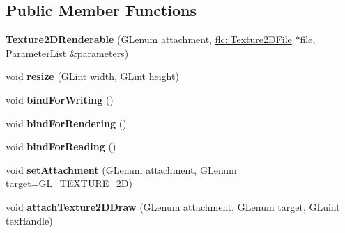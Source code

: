 \subsection*{Public Member Functions}
\begin{DoxyCompactItemize}
\item 
{\bfseries Texture2\+D\+Renderable} (G\+Lenum attachment, \hyperlink{classflw_1_1flc_1_1Texture2DFile}{flc\+::\+Texture2\+D\+File} $\ast$file, Parameter\+List \&parameters)\hypertarget{classflw_1_1flc_1_1Texture2DRenderable_afcb0b361ecb1864667fd45082874a0f5}{}\label{classflw_1_1flc_1_1Texture2DRenderable_afcb0b361ecb1864667fd45082874a0f5}

\item 
void {\bfseries resize} (G\+Lint width, G\+Lint height)\hypertarget{classflw_1_1flc_1_1Texture2DRenderable_aebcd2fea21b574145f4c415dd35ae168}{}\label{classflw_1_1flc_1_1Texture2DRenderable_aebcd2fea21b574145f4c415dd35ae168}

\item 
void {\bfseries bind\+For\+Writing} ()\hypertarget{classflw_1_1flc_1_1Texture2DRenderable_aecee11c1f1089b57b1b795645c3017e4}{}\label{classflw_1_1flc_1_1Texture2DRenderable_aecee11c1f1089b57b1b795645c3017e4}

\item 
void {\bfseries bind\+For\+Rendering} ()\hypertarget{classflw_1_1flc_1_1Texture2DRenderable_abc96dcdc0a74ec89a5d7651f90ae8a0d}{}\label{classflw_1_1flc_1_1Texture2DRenderable_abc96dcdc0a74ec89a5d7651f90ae8a0d}

\item 
void {\bfseries bind\+For\+Reading} ()\hypertarget{classflw_1_1flc_1_1Texture2DRenderable_af6e7b50ce2f60f9678c03946f6a2db21}{}\label{classflw_1_1flc_1_1Texture2DRenderable_af6e7b50ce2f60f9678c03946f6a2db21}

\item 
void {\bfseries set\+Attachment} (G\+Lenum attachment, G\+Lenum target=G\+L\+\_\+\+T\+E\+X\+T\+U\+R\+E\+\_\+2D)\hypertarget{classflw_1_1flc_1_1Texture2DRenderable_a15077132aaaa9b98b55f9d581ad3ba11}{}\label{classflw_1_1flc_1_1Texture2DRenderable_a15077132aaaa9b98b55f9d581ad3ba11}

\item 
void {\bfseries attach\+Texture2\+D\+Draw} (G\+Lenum attachment, G\+Lenum target, G\+Luint tex\+Handle)\hypertarget{classflw_1_1flc_1_1Texture2DRenderable_a0f73aa013a48c510dffbf12eef80aca8}{}\label{classflw_1_1flc_1_1Texture2DRenderable_a0f73aa013a48c510dffbf12eef80aca8}


\end{DoxyCompactItemize}
